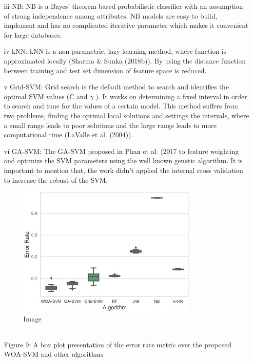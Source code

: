 \documentclass{article}
\begin{document}
iii NB: NB is a Bayes’ theorem based probabilistic classifier with an assumption of strong independence among attributes. NB models are easy to build, implement and has no complicated iterative parameter which makes it convenient for large databases.


iv kNN: kNN is a non-parametric, lazy learning method, where function is approximated locally (Sharma & Sunka (2018b)). By using the distance function between training and test set dimension of feature space is reduced.


v Grid-SVM: Grid search is the default method to search and identifies the optimal SVM values (C and $\gamma$ ). It works on determining a fixed interval in order to search and tune for the values of a certain model. This method suffers from two problems, finding the optimal local solutions and settings the intervals, where a small range leads to poor solutions and the large range leads to more computational time (LaValle et al. (2004)).


vi GA-SVM: The GA-SVM proposed in Phan et al. (2017 to feature weighting and optimize the SVM parameters using the well known genetic algorithm. It is important to mention that, the work didn’t applied the internal cross validation to increase the robust of the SVM.


\begin{figure}[htbp]
\centering
\includegraphics[width=0.8\textwidth]{images/691e3e4fd28e868d09ef54655323bc7e12274adaf194f1246ad306f060ab0f92.jpg}
\caption{Image}
\end{figure}

\\
Figure 9: A box plot presentation of the error rate metric over the proposed WOA-SVM and other algorithms
\end{document}
